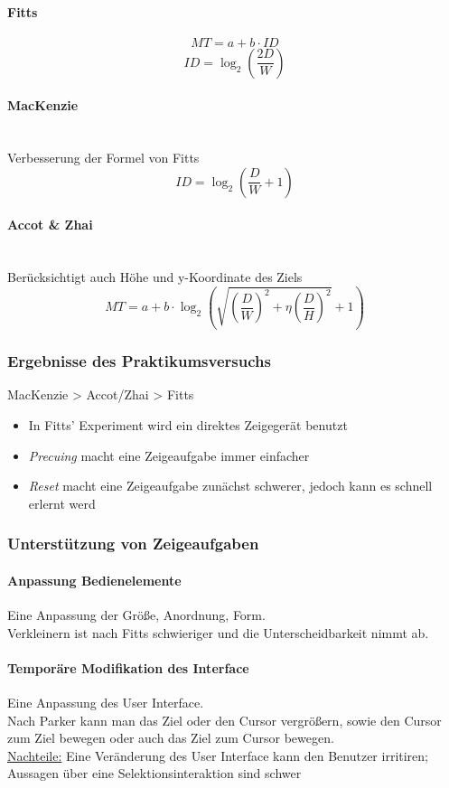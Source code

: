 \documentclass
[
	8pt,		%
	ngerman,	%
	a4paper,	%
	landscape,	%
	final		%
]{extarticle}
\begin{document}
\begin{multicols*}{4}
	\paragraph{Fitts}
	\[MT = a + b \cdot ID\]
	\[ID = \log_{2}\left(\frac{2D}{W}\right)\]
	\paragraph{MacKenzie}\mbox{}\\
	Verbesserung der Formel von Fitts
	\[ID = \log_{2}\left(\frac{D}{W} + 1\right)\]
	\paragraph{Accot \& Zhai}\mbox{}\\
	Berücksichtigt auch Höhe und y-Koordinate des Ziels
	\[MT = a + b \cdot \log_{2}\left(\sqrt{\left(\frac{D}{W}\right)^{2}+\eta\left(\frac{D}{H}\right)^{2}} + 1\right)\]
	\subsubsection{Ergebnisse des Praktikumsversuchs}
	MacKenzie > Accot/Zhai > Fitts
	\begin{itemize}
		\item In Fitts' Experiment wird ein direktes Zeigegerät benutzt
		\item \emph{Precuing} macht eine Zeigeaufgabe immer einfacher
		\item \emph{Reset} macht eine Zeigeaufgabe zunächst schwerer, jedoch
		      kann es schnell erlernt werd
	\end{itemize}
	\subsubsection{Unterstützung von Zeigeaufgaben}
	\paragraph{Anpassung Bedienelemente} Eine Anpassung der Größe, Anordnung,
	Form. \\ Verkleinern ist nach Fitts schwieriger und die Unterscheidbarkeit
	nimmt ab.
	\paragraph{Temporäre Modifikation des Interface} Eine Anpassung des User
	Interface. \\ Nach Parker kann man das Ziel oder den Cursor vergrößern,
	sowie den Cursor zum Ziel bewegen oder auch das Ziel zum Cursor bewegen. \\
	\underline{Nachteile:} Eine Veränderung des User Interface kann den Benutzer
	irritiren; Aussagen über eine Selektionsinteraktion sind schwer

\end{multicols*}
\end{document}
